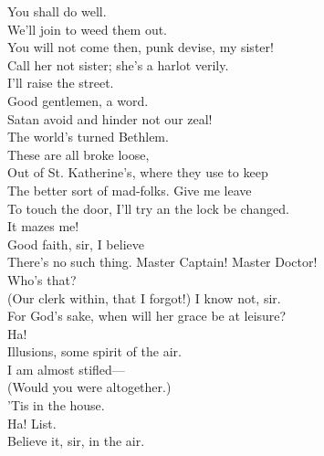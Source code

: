 \documentclass[a4paper,oneside,12pt]{memoir}
\begin{document}
\begin{drama*}
\tribulationspeaks You shall do well.\\
\persecutionspeaks {} We'll join to weed them out.\\
\kastrilspeaks You will not come then, punk devise, my sister!\\
\persecutionspeaks Call her not sister; she's a harlot verily.\\
\kastrilspeaks I'll raise the street.\\
\lovewitspeaks {} Good gentlemen, a word.\\
\persecutionspeaks Satan avoid and hinder not our zeal!\\
\lovewitspeaks The world's turned Bethlem.\\
\facespeaks {} These are all broke loose,\\
Out of St. Katherine's, where they use to keep\\
The better sort of mad-folks. Give me leave\\
To touch the door, I'll try an the lock be changed.\\
\lovewitspeaks It mazes me!\\
\facespeaks {} Good faith, sir, I believe\\
There's no such thing.
\dapperspeaks {}  Master Captain! Master Doctor!\\
\lovewitspeaks Who's that?\\
\facespeaks {} (Our clerk within, that I forgot!) I know not, sir.\\
\dapperspeaks {} For God's sake, when will her grace be at leisure?\\
\facespeaks {} Ha!\\
Illusions, some spirit of the air.\\
\dapperspeaks {}  I am almost stifled---\\
\facespeaks (Would you were altogether.)\\
\lovewitspeaks {} 'Tis in the house.\\
Ha! List.\\
\facespeaks {} Believe it, sir, in the air.\\

\end{drama*}
\end{document}
